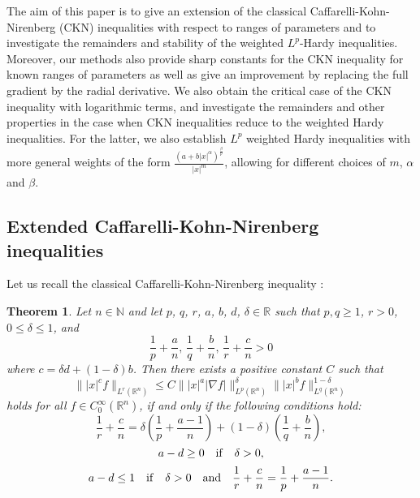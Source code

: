 \documentclass[a4paper,12pt,reqno]{amsart}
\numberwithin{equation}{section}
\theoremstyle{plain}
\newtheorem{thm}{Theorem}[section]
\theoremstyle{definition}
\newcommand{\Rn}{\mathbb R^{n}}
\begin{document}
The aim of this paper is to give an extension of the classical Caffarelli-Kohn-Nirenberg (CKN) inequalities \cite{CKN84} with respect to ranges of parameters and to investigate the remainders and stability of the weighted $L^p$-Hardy inequalities. Moreover, our methods also provide sharp constants for the CKN inequality for known ranges of parameters as well as give an improvement by replacing the full gradient by the radial derivative. We also obtain the critical case of the CKN inequality with logarithmic terms, and investigate the remainders and other properties in the case when CKN inequalities reduce to the weighted Hardy inequalities.
For the latter, we also establish $L^p$ weighted Hardy inequalities with more general weights of the form $\frac{(a+b|x|^{\alpha})^{\frac{\beta}{p}}}{|x|^{m}}$, allowing for different choices of $m$, $\alpha$ and $\beta$.

\subsection{Extended Caffarelli-Kohn-Nirenberg inequalities}

Let us recall the classical Caffarelli-Kohn-Nirenberg inequality \cite{CKN84}:

\begin{thm}\label{clas_CKN}
Let $n\in\mathbb{N}$ and let $p$, $q$, $r$, $a$, $b$, $d$, $\delta\in \mathbb{R}$ such that $p,q\geq1$, $r>0$, $0\leq\delta\leq1$, and
\begin{equation}\label{clas_CKN0}
\frac{1}{p}+\frac{a}{n},\, \frac{1}{q}+\frac{b}{n},\, \frac{1}{r}+\frac{c}{n}>0
\end{equation}
where $c=\delta d + (1-\delta) b$. Then there exists a positive constant $C$ such that
\begin{equation}\label{clas_CKN1}
\||x|^{c}f\|_{L^{r}(\Rn)}\leq C \||x|^{a}|\nabla f|\|^{\delta}_{L^{p}(\Rn)} \||x|^{b}f\|^{1-\delta}_{L^{q}(\Rn)}
\end{equation}
holds for all $f\in C_{0}^{\infty}(\Rn)$, if and only if the following conditions hold:
\begin{equation}\label{clas_CKN2}
\frac{1}{r}+\frac{c}{n}=\delta \left(\frac{1}{p}+\frac{a-1}{n}\right)+(1-\delta)\left(\frac{1}{q}+\frac{b}{n}\right),
\end{equation}
\begin{equation}\label{clas_CKN3}
a-d\geq 0 \quad {\rm if} \quad \delta>0,
\end{equation}
\begin{equation}\label{clas_CKN4}
a-d\leq 1 \quad {\rm if} \quad \delta>0 \quad {\rm and} \quad \frac{1}{r}+\frac{c}{n}=\frac{1}{p}+\frac{a-1}{n}.
\end{equation}
\end{thm}
\end{document}
